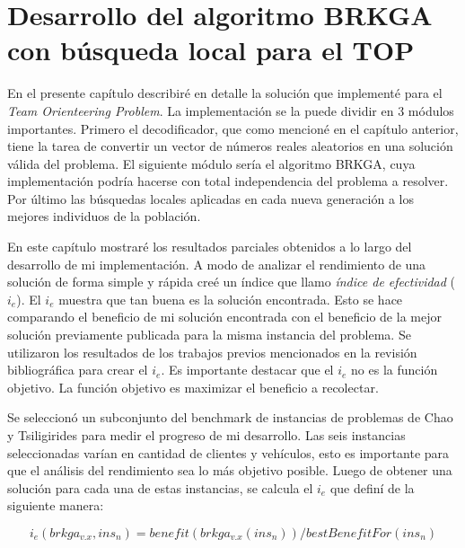 
\chapter{Desarrollo del algoritmo BRKGA con búsqueda local para el TOP}

En el presente capítulo describiré en detalle la solución que implementé para el \textit{Team Orienteering Problem}. La implementación se la puede dividir en 3 módulos importantes. Primero el decodificador, que como mencioné en el capítulo anterior, tiene la tarea de convertir un vector de números reales aleatorios en una solución válida del problema. El siguiente módulo sería el algoritmo BRKGA, cuya implementación podría hacerse con total independencia del problema a resolver. Por último las búsquedas locales aplicadas en cada nueva generación a los mejores individuos de la población. 

\bigskip

En este capítulo mostraré los resultados parciales obtenidos a lo largo del desarrollo de mi implementación. A modo de analizar el rendimiento de una solución de forma simple y rápida creé un índice que llamo \textit{índice de efectividad} ($i_e$). El $i_e$ muestra que tan buena es la solución encontrada. Esto se hace comparando el beneficio de mi solución encontrada con el beneficio de la mejor solución previamente publicada para la misma instancia del problema. Se utilizaron los resultados de los trabajos previos mencionados en la revisión bibliográfica para crear el $i_e$. Es importante destacar que el $i_e$ no es la función objetivo. La función objetivo es maximizar el beneficio a recolectar. 

\bigskip

Se seleccionó un subconjunto del benchmark de instancias de problemas de Chao y Tsiligirides \cite{IntancesChaoTsiligirides} para medir el progreso de mi desarrollo. Las seis instancias seleccionadas varían en cantidad de clientes y vehículos, esto es importante para que el análisis del rendimiento sea lo más objetivo posible. Luego de obtener una solución para cada una de estas instancias, se calcula el $i_e$ que definí de la siguiente manera:

\begin{equation}
i_e(brkga_{v.x},ins_n) = benefit(brkga_{v.x}(ins_n)) / bestBenefitFor(ins_n) \label{eq:iefectividad}
\end{equation}

\bigskip


